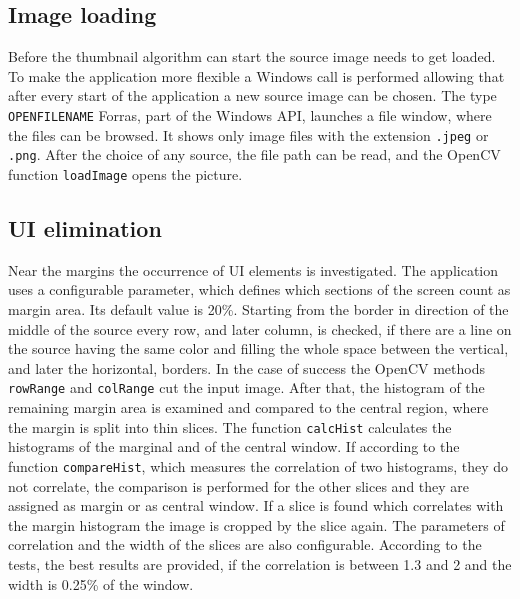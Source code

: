 \documentclass[draft,final]{vutinfth} %
\begin{document}
	\subsection{Image loading}
	Before the thumbnail algorithm can start the source image needs to get loaded.
	To make the application more flexible a Windows call is performed allowing that after every start of the application a new source image can be chosen.
	The type \texttt{OPENFILENAME} Forras, part of the Windows API, launches a file window, where the files can be browsed.
	It shows only image files with the extension \texttt{.jpeg} or \texttt{.png}.
	After the choice of any source, the file path can be read, and the OpenCV function \texttt{loadImage} opens the picture.
	
	\subsection{UI elimination}
	Near the margins the occurrence of UI elements is investigated.
	The application uses a configurable parameter, which defines which sections of the screen count as margin area. 
	Its default value is 20\%. 
	Starting from the border in direction of the middle of the source every row, and later column, is checked, if there are a line on the source having the same color and filling the whole space between the vertical, and later the horizontal, borders.
	In the case of success the OpenCV methods \texttt{rowRange} and \texttt{colRange} cut the input image.
	After that, the histogram of the remaining margin area is examined and compared to the central region, where the margin is split into thin slices.
	The function \texttt{calcHist} calculates the histograms of the marginal and of the central window.
	If according to the function \texttt{compareHist}, which measures the correlation of two histograms,%
	they do not correlate, the comparison is performed for the other slices and they are assigned as margin or as central window.
	If a slice is found which correlates with the margin histogram the image is cropped by the slice again. 
	The parameters of correlation and the width of the slices are also configurable.
	According to the tests, the best results are provided, if the correlation is between 1.3 and 2 and the width is 0.25\% of the window.
	
\end{document}
